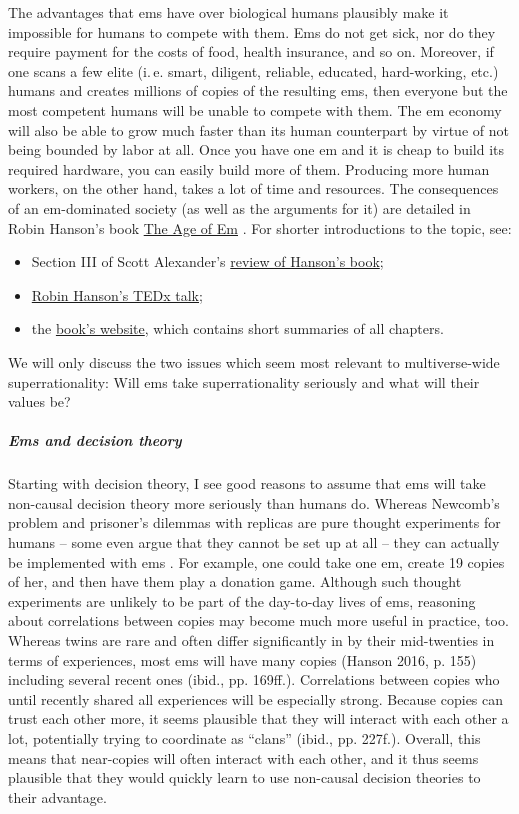 \documentclass[]{article}
\let\oldsubparagraph\subparagraph
\renewcommand{\subparagraph}[1]{\oldsubparagraph{#1}\mbox{}}
\begin{document}
The advantages that ems have over biological humans plausibly make it
impossible for humans to compete with them. Ems do not get sick, nor do
they require payment for the costs of food, health insurance, and so on.
Moreover, if one scans a few elite (i.\,e. smart, diligent, reliable,
educated, hard-working, etc.) humans and creates millions of copies of
the resulting ems, then everyone but the most competent humans will be
unable to compete with them. The em economy will also be able to grow
much faster than its human counterpart by virtue of not being bounded by
labor at all. Once you have one em and it is cheap to build its required
hardware, you can easily build more of them. Producing more human
workers, on the other hand, takes a lot of time and resources. The
consequences of an em-dominated society (as well as the arguments for
it) are detailed in Robin Hanson's book 
\href{http://ageofem.com/}{The Age of Em} \citeyear{Hanson2016-yn}. For shorter
introductions to the topic, see:

\begin{itemize}
\item
  Section III of Scott Alexander's
  \href{http://slatestarcodex.com/2016/05/28/book-review-age-of-em/}{review
  of Hanson's book};
\item
  \href{https://www.youtube.com/watch?v=9qcIsjrHENU}{Robin
  Hanson's TEDx talk};
\item
  the \href{http://ageofem.com/}{book's website}, which contains
  short summaries of all chapters.
\end{itemize}

We will only discuss the two issues which seem most relevant to
multiverse-wide superrationality: Will ems take superrationality
seriously and what will their values be?

\subparagraph{Ems and decision theory}\label{ems-and-decision-theory}

Starting with decision theory, I see good reasons to assume that ems
will take non-causal decision theory more seriously than humans do.
Whereas Newcomb's problem and prisoner's dilemmas with replicas are pure
thought experiments for humans -- some even argue that they cannot be
set up at all \parencite{Binmore2007-mk} -- they can actually be implemented with ems
\parencite{Yudkowsky2010-xo}. For example, one could take
one em, create 19 copies of her, and then have them play a donation
game. Although such thought experiments are unlikely to be part of the
day-to-day lives of ems, reasoning about correlations between copies may
become much more useful in practice, too. Whereas twins are rare and
often differ significantly in by their mid-twenties in terms of
experiences, most ems will have many copies (Hanson 2016, p. 155)
including several recent ones (ibid., pp. 169ff.). Correlations between
copies who until recently shared all experiences will be especially
strong. Because copies can trust each other more, it seems plausible
that they will interact with each other a lot, potentially trying to
coordinate as ``clans'' (ibid., pp. 227f.). Overall, this means that
near-copies will often interact with each other, and it thus seems
plausible that they would quickly learn to use non-causal decision
theories to their advantage.
\end{document}
